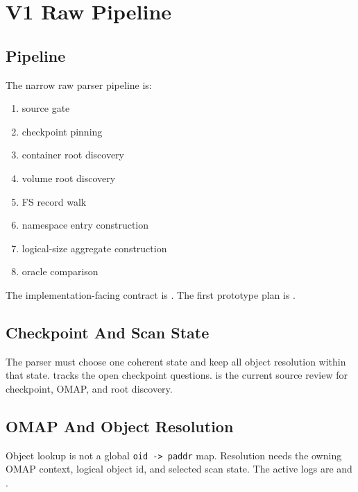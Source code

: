 \chapter{V1 Raw Pipeline}

\section{Pipeline}

The narrow raw parser pipeline is:

\begin{enumerate}
  \item source gate
  \item checkpoint pinning
  \item container root discovery
  \item volume root discovery
  \item FS record walk
  \item namespace entry construction
  \item logical-size aggregate construction
  \item oracle comparison
\end{enumerate}

The implementation-facing contract is
. The first prototype
plan is .

\section{Checkpoint And Scan State}

The parser must choose one coherent state and keep all object resolution within
that state. 
tracks the open checkpoint questions. 
is the current source review for checkpoint, OMAP, and root discovery.

\section{OMAP And Object Resolution}

Object lookup is not a global \texttt{oid -> paddr} map. Resolution needs the
owning OMAP context, logical object id, and selected scan state. The active logs
are  and
.

